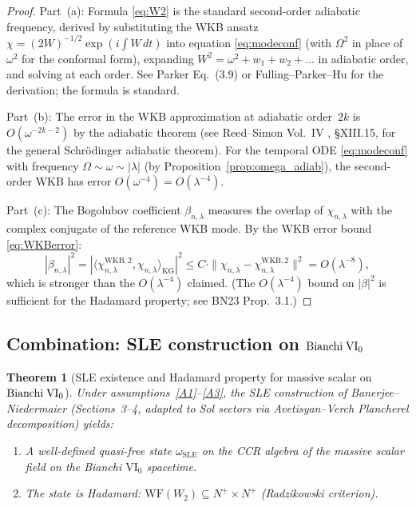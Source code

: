 \documentclass[11pt,a4paper]{article}
\newtheorem{theorem}{Theorem}[section]
\theoremstyle{definition}
\newcommand{\BVI}{{\rm Bianchi\;VI_0}}
\newcommand{\WF}{\mathrm{WF}}
\begin{document}
\begin{proof}
Part~(a): Formula \eqref{eq:W2} is the standard second-order adiabatic frequency,
derived by substituting the WKB ansatz $\chi = (2W)^{-1/2}\exp(i\int W\,dt)$ into
equation \eqref{eq:modeconf} (with $\Omega^2$ in place of $\omega^2$ for the conformal
form), expanding $W^2 = \omega^2 + w_1 + w_2 + \ldots$ in adiabatic order,
and solving at each order.  See Parker \cite{Par69} Eq.~(3.9) or
Fulling--Parker--Hu for the derivation; the formula is standard.

Part~(b): The error in the WKB approximation at adiabatic order~$2k$ is $O(\omega^{-2k-2})$
by the adiabatic theorem (see Reed--Simon Vol.~IV \cite{RS4}, §XIII.15, for the
general Schr\"odinger adiabatic theorem).  For the temporal ODE \eqref{eq:modeconf}
with frequency $\Omega \sim \omega \sim |\lambda|$ (by Proposition~\ref{prop:omega_adiab}),
the second-order WKB has error $O(\omega^{-4}) = O(\lambda^{-4})$.

Part~(c): The Bogolubov coefficient $\beta_{n,\lambda}$ measures the overlap of
$\chi_{n,\lambda}$ with the complex conjugate of the reference WKB mode.
By the WKB error bound \eqref{eq:WKBerror}:
\[
  |\beta_{n,\lambda}|^2
  = \left|\langle \chi_{n,\lambda}^{\mathrm{WKB},2}, \chi_{n,\lambda}\rangle_{\mathrm{KG}}\right|^2
  \leq C \cdot \|\chi_{n,\lambda} - \chi_{n,\lambda}^{\mathrm{WKB},2}\|^2
  = O(\lambda^{-8}),
\]
which is stronger than the $O(\lambda^{-4})$ claimed.  (The $O(\lambda^{-4})$
bound on $|\beta|^2$ is sufficient for the Hadamard property; see BN23 Prop.~3.1.)
\end{proof}

\subsection{Combination: SLE construction on $\BVI$}

\begin{theorem}[SLE existence and Hadamard property for massive scalar on $\BVI$]
\label{thm:main}
Under assumptions~\ref{A1}--\ref{A3}, the SLE construction of
Banerjee--Niedermaier \cite{BN23} (Sections~3--4, adapted to Sol sectors via
Avetisyan--Verch \cite{AV13} Plancherel decomposition) yields:
\begin{enumerate}[label=(\alph*)]
  \item A well-defined quasi-free state $\omega_{\mathrm{SLE}}$ on the CCR algebra
        of the massive scalar field on the Bianchi $\mathrm{VI_0}$ spacetime.
  \item The state is Hadamard: $\WF(W_2) \subseteq N^+ \times N^+$
        (Radzikowski \cite{Rad96} criterion).
\end{enumerate}
\end{theorem}
\end{document}
